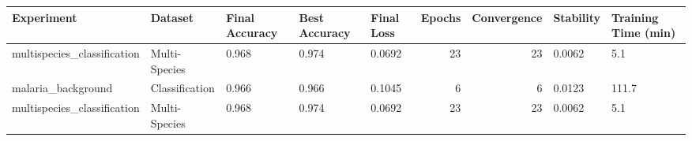 \begin{tabular}{lllllrrll}
\toprule
                 Experiment &        Dataset & Final Accuracy & Best Accuracy & Final Loss &  Epochs &  Convergence & Stability & Training Time (min) \\
\midrule
multispecies\_classification &  Multi-Species &          0.968 &         0.974 &     0.0692 &      23 &           23 &    0.0062 &                 5.1 \\
         malaria\_background & Classification &          0.966 &         0.966 &     0.1045 &       6 &            6 &    0.0123 &               111.7 \\
multispecies\_classification &  Multi-Species &          0.968 &         0.974 &     0.0692 &      23 &           23 &    0.0062 &                 5.1 \\
\bottomrule
\end{tabular}
